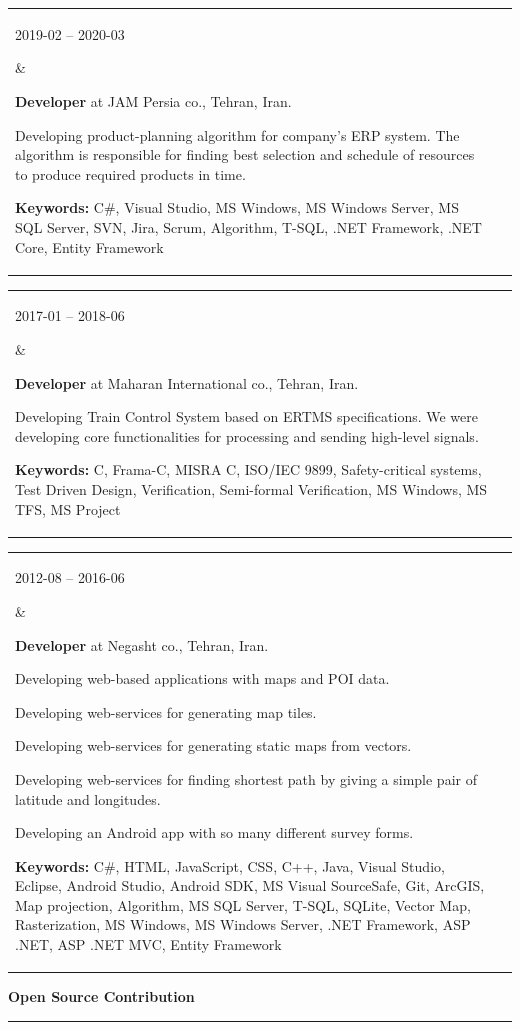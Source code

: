 \documentclass[11pt,a4paper,oneside]{article}
\makeatletter
\newcommand{\keywords}[1]{\textbf{Keywords:} #1}
\renewcommand{\section}[1]{%
{\large\textbf{#1}}\\
\rule[9pt]{18cm}{.4pt}\vspace{-16pt}%
}
\newenvironment{mytable}{%
\begin{tabular}{@{}l@{\hspace{4mm}}l@{}}%
}{\end{tabular}}
\newcommand{\myitem}[2]{%
\parbox[t]{16mm}{#1}&\parbox[t]{16cm}{#2}\\%
}
\makeatother
\begin{document}
\begin{mytable}
\myitem{2019-02 -- 2020-03}{%
\textbf{Developer} at
JAM Persia co., Tehran, Iran.

Developing product-planning algorithm for company's ERP system.
The algorithm is responsible for finding best selection and
schedule of resources to produce required products in time.

\keywords{%
	C\#, Visual Studio, MS Windows, MS Windows Server,
	MS SQL Server, SVN, Jira, Scrum, Algorithm, T-SQL,
	.NET Framework, .NET Core, Entity Framework
}
}
\end{mytable}

\begin{mytable}
\myitem{2017-01 -- 2018-06}{
\textbf{Developer} at
Maharan International co., Tehran, Iran.

Developing Train Control System based on ERTMS specifications.
We were developing core functionalities for processing and
sending high-level signals.

\keywords{%
	C, Frama-C, MISRA C, ISO/IEC 9899, Safety-critical systems,
	Test Driven Design, Verification, Semi-formal Verification,
	MS Windows, MS TFS, MS Project
}
}
\end{mytable}

\begin{mytable}
\myitem{2012-08 -- 2016-06}{
\textbf{Developer} at
Negasht co., Tehran, Iran.

Developing web-based applications with maps and POI data.

Developing web-services for generating map tiles.

Developing web-services for generating static maps from vectors.

Developing web-services for finding shortest path by giving a
simple pair of latitude and longitudes.

Developing an Android app with so many different survey forms.

\keywords{%
	C\#, HTML, JavaScript, CSS, C++, Java, Visual Studio, Eclipse,
	Android Studio, Android SDK, MS Visual SourceSafe, Git, ArcGIS,
	Map projection, Algorithm, MS SQL Server, T-SQL, SQLite,
	Vector Map, Rasterization, MS Windows, MS Windows Server,
	.NET Framework, ASP .NET, ASP .NET MVC, Entity Framework
}
}
\end{mytable}

\section{Open Source Contribution}
\end{document}
